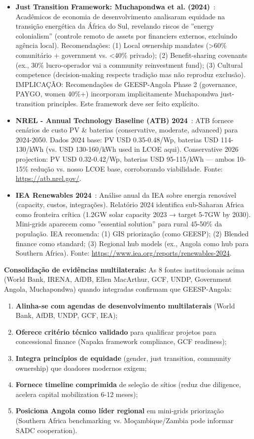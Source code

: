 \documentclass[12pt, a4paper]{article}
\begin{document}
\begin{itemize}
  \item \textbf{Just Transition Framework: Muchapondwa et al. (2024)}~\citep{Muchapondwa2024}: Acadêmicos de economia de desenvolvimento analisaram equidade na transição energética da África do Sul, revelando riscos de ''energy colonialism'' (controle remoto de assets por financiers externos, excluindo agência local). Recomendações: (1) Local ownership mandates (>60\% comunitário + government vs. <40\% privado); (2) Benefit-sharing covenants (ex., 30\% lucro-operador vai a community reinvestment fund); (3) Cultural competence (decision-making respects tradição mas não reproduz exclusão). IMPLICAÇÃO: Recomendações de GEESP-Angola Phase 2 (governance, PAYGO, women 40\%+) incorporam implicitamente Muchapondwa just-transition principles. Este framework deve ser feito explícito.

  \item \textbf{NREL - Annual Technology Baseline (ATB) 2024}~\citep{NREL2024}: ATB fornece cenários de custo PV \& baterias (conservative, moderate, advanced) para 2024-2050. Dados 2024 base: PV USD 0.35-0.48/Wp, baterias USD 114-130/kWh (vs. USD 130-160/kWh used in LCOE aqui). Conservative 2026 projection: PV USD 0.32-0.42/Wp, baterias USD 95-115/kWh — ambos 10-15\% redução vs. nosso LCOE base, corroborando viabilidade. Fonte: \url{https://atb.nrel.gov/}.
  
  \item \textbf{IEA Renewables 2024}~\citep{IEA2024}: Análise anual da IEA sobre energia renovável (capacity, custos, integrações). Relatório 2024 identifica sub-Saharan Africa como fronteira crítica (1.2GW solar capacity 2023 → target 5-7GW by 2030). Mini-grids aparecem como ''essential solution'' para rural 45-50\% da população. IEA recomenda: (1) GIS priorização (como GEESP); (2) Blended finance como standard; (3) Regional hub models (ex., Angola como hub para Southern Africa). Fonte: \url{https://www.iea.org/reports/renewables-2024}.

\end{itemize}

\textbf{Consolidação de evidências multilaterais:} As 8 fontes institucionais acima (World Bank, IRENA, AfDB, Ellen MacArthur, GCF, UNDP, Government Angola, Muchapondwa) quando integradas confirmam que GEESP-Angola:
\begin{enumerate}
\item \textbf{Alinha-se com agendas de desenvolvimento multilaterais} (World Bank, AfDB, UNDP, GCF, IEA);
\item \textbf{Oferece critério técnico validado} para qualificar projetos para concessional finance (Napaka framework compliance, GCF readiness);
\item \textbf{Integra princípios de equidade} (gender, just transition, community ownership) que doadores modernos exigem;
\item \textbf{Fornece timeline comprimida} de seleção de sítios (reduz due diligence, acelera capital mobilization 6-12 meses);
\item \textbf{Posiciona Angola como líder regional} em mini-grids priorização (Southern Africa benchmarking vs. Moçambique/Zambia pode informar SADC cooperation).
\end{enumerate}
\end{document}
